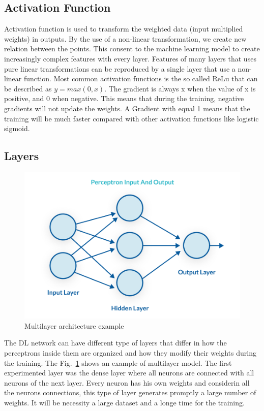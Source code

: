 \documentclass[12pt]{report}
\begin{document}
\subsection{Activation Function}

Activation function is used to transform the weighted data (input multiplied weights) 
in outputs.
By the use of a non-linear transformation, we create new relation between the points.
This consent to the machine learning model to create increasingly complex features with every layer.
Features of many layers that uses pure linear transformations can be reproduced by a single 
layer that use a non-linear function. 
Most common activation functions is the so called ReLu that
can be described as $y = max(0, x)$. The gradient is always x when the value of x is positive, 
and 0 when negative. This means that during the training, negative gradients will not update the weights.
A Gradient with equal 1 means that the training will be much faster compared with other activation functions
like logistic sigmoid.

\subsection{Layers}

\begin{figure}[t]
    \centering
    \includegraphics[scale=.5]{multilayer-perceptron.png}
    \caption{Multilayer architecture example \cite{percepimage}}
    \label{fig:multilayer}
\end{figure}

The DL network can have different type of layers that differ in how the perceptrons inside them are organized and 
how they modify their weights during the training. 
The Fig.~\ref{fig:multilayer} shows an example of multilayer model.
The first experimented layer was the dense layer where all neurons are connected
with all neurons of the next layer. Every neuron has his own weights
and considerin all the neurons connections, this type of layer generates promptly a large number of weights.
It will be  necessity a large
dataset and a longe time for the training. 
\end{document}
